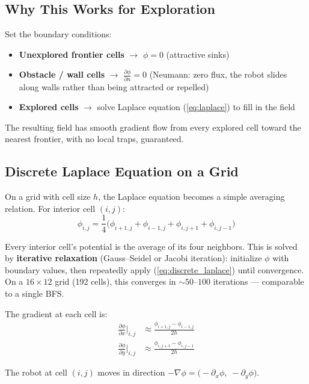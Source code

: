 \documentclass[11pt]{article}
\begin{document}
\subsection{Why This Works for Exploration}

Set the boundary conditions:
\begin{itemize}
    \item \textbf{Unexplored frontier cells} $\to$ $\phi = 0$
    (attractive sinks)
    \item \textbf{Obstacle / wall cells} $\to$
    $\frac{\partial\phi}{\partial n} = 0$ (Neumann: zero flux, the
    robot slides along walls rather than being attracted or repelled)
    \item \textbf{Explored cells} $\to$ solve Laplace equation
    (\ref{eq:laplace}) to fill in the field
\end{itemize}

The resulting field has smooth gradient flow from every explored cell
toward the nearest frontier, with no local traps, guaranteed.

\subsection{Discrete Laplace Equation on a Grid}

On a grid with cell size $h$, the Laplace equation becomes a
simple averaging relation.  For interior cell $(i,j)$:
\begin{equation}
    \phi_{i,j} = \frac{1}{4}\bigl(\phi_{i+1,j} + \phi_{i-1,j}
    + \phi_{i,j+1} + \phi_{i,j-1}\bigr)
    \label{eq:discrete_laplace}
\end{equation}

Every interior cell's potential is the average of its four neighbors.
This is solved by \textbf{iterative relaxation} (Gauss--Seidel or
Jacobi iteration): initialize $\phi$ with boundary values, then
repeatedly apply (\ref{eq:discrete_laplace}) until convergence.
On a $16 \times 12$ grid (192 cells), this converges in
${\sim}50$--$100$ iterations --- comparable to a single BFS.

The gradient at each cell is:
\begin{align}
    \frac{\partial\phi}{\partial x}\bigg|_{i,j} &\approx
    \frac{\phi_{i+1,j} - \phi_{i-1,j}}{2h} \\
    \frac{\partial\phi}{\partial y}\bigg|_{i,j} &\approx
    \frac{\phi_{i,j+1} - \phi_{i,j-1}}{2h}
\end{align}

The robot at cell $(i,j)$ moves in direction
$-\nabla\phi = \bigl(-\partial_x\phi,\; -\partial_y\phi\bigr)$.
\end{document}

